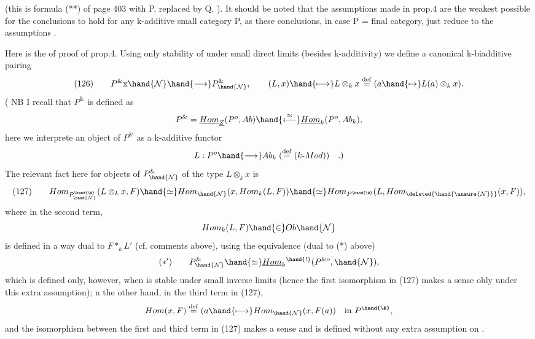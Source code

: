 
 (this is formula (**) of page 403  with
P,  replaced by Q, ). It should be noted that the assumptions  made
in prop.4 are the weakest possible for the conclusions to hold
\deleted{(}for any k-additive small category P\deleted{)}, as these conclusions, in case
P = final category, just reduce to the assumptions .

Here is the   of proof of prop.4. Using only stability
of  under small direct limits (besides k-additivity) we define a
canonical  k-biadditive pairing
\[ (126) \qquad P^{\&} \mathrm{x} \hand{\mathcal{N}} \hand{\longrightarrow} P^{\&}_{\hand{\mathcal{N}}} , \qquad (L,x) \hand{\longmapsto} L\otimes_k x \overset{\mathrm{def}}{=} (a \hand{\mapsto} L(a)\otimes_k x ). \]
( NB I recall that $P^{\&}$ is defined as
\[ P^{\&} = \underline{Hom}_{\underline{Z}}(P^{o},Ab) \hand{\overset{\approx}{\longleftarrow}} \underline{Hom}_k(P^{o}, Ab_k ) , \]
here we interprete an object of $P^{\&}$ as a k-additive functor
\[ L : P^{o} \hand{\longrightarrow} Ab_k \; (\overset{\mathrm{def}}{=} (k\text{-}Mod)) \quad .) \]
The relevant fact here for objects of $P^{\&}_{\hand{\mathcal{N}}}$ of the type $L\otimes_k x$ is
\[ (127) \qquad Hom_{P^{\hand{\&}}_{\hand{\mathcal{N}}}}(L\otimes_k x,F) \hand{\simeq} Hom_{\hand{\mathcal{N}}}(x,Hom_k(L,F)) \hand{\simeq} Hom_{P^{\hand{\&}}}(L, Hom_{\deleted{\hand{\unsure{\mathcal{N}}}}}(x,F)) , \]
where in the second term,
\[ Hom_k(L,F) \hand{\in} Ob \hand{\mathcal{N}} \]
is defined in a way dual to $F *_k L'$ (cf. comments above), using the
equivalence (dual to (*) above)
\[ (*') \qquad P^{\&}_{\hand{\mathcal{N}}} \hand{\simeq} \underline{Hom}_k{}^{\hand{!}}(P^{\& o}, \hand{\mathcal{N}}) , \]
which is defined only, however, when  is stable under small inverse
limits (hence the first isomorphism in (127) makes a sense ohly under
this extra assumption); n the other hand, in the third term in (127),
\[ Hom(x,F) \overset{\mathrm{def}}{=} (a \hand{\longmapsto} Hom_{\hand{\mathcal{N}}}(x,F(a)) \quad \text{in } P^{\hand{\&}} , \]
and the isomorphism between the first and third term in (127) makes a
sense and is defined without any extra assumption on .


